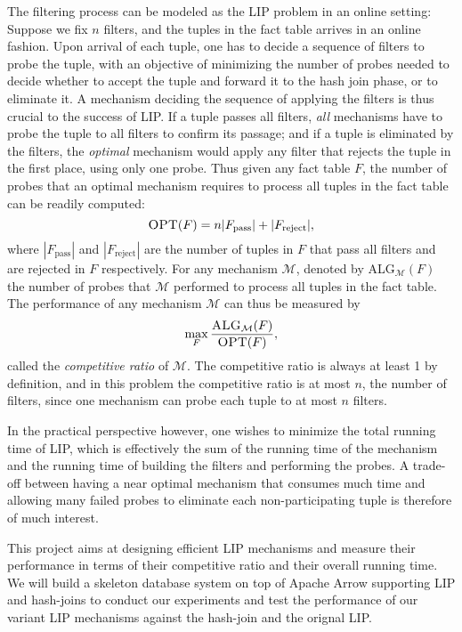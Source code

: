 \documentclass[10pt]{article}
\begin{document}
The filtering process can be modeled as the \textsc{LIP} problem in an online setting: Suppose we fix $n$ filters, and the tuples in the fact table arrives in an online fashion. Upon arrival of each tuple, one has to decide a sequence of filters to probe the tuple, with an objective of minimizing the number of probes needed to decide whether to accept the tuple and forward it to the hash join phase, or to eliminate it. A mechanism deciding the sequence of applying the filters is thus crucial to the success of LIP. If a tuple passes all filters, \textit{all} mechanisms have to probe the tuple to all filters to confirm its passage; and if a tuple is eliminated by the filters, the \textit{optimal} mechanism would apply any filter that rejects the tuple in the first place, using only one probe. Thus given any fact table $F$, the number of probes that an optimal mechanism requires to process all tuples in the fact table can be readily computed: 
\[
	\textsc{OPT}(F) = n|F_{\text{pass}}| + |F_{\text{reject}}|,
\]
where $|F_{\text{pass}}|$ and $|F_{\text{reject}}|$ are the number of tuples in $F$ that pass all filters and are rejected in $F$ respectively. For any mechanism $\mathcal{M}$, denoted by \textsc{ALG}$_{\mathcal{M}}(F)$ the number of probes that $\mathcal{M}$ performed to process all tuples in the fact table.  The performance of any mechanism $\mathcal{M}$ can thus be measured by 
\[
	\max_{F}\frac{\textsc{ALG}_{\mathcal{M}}(F)}{\textsc{OPT}(F)},
\]
called the \textit{competitive ratio} of $\mathcal{M}$. The competitive ratio is always at least 1 by definition, and in this problem the competitive ratio is at most $n$, the number of filters, since one mechanism can probe each tuple to at most $n$ filters.


In the practical perspective however, one wishes to minimize the total running time of LIP, which is effectively the sum of the running time of the mechanism and the running time of building the filters and performing the probes. A trade-off between having a near optimal mechanism that consumes much time and allowing many failed probes to eliminate each non-participating tuple is therefore of much interest. 


This project aims at designing efficient LIP mechanisms and measure their performance in terms of their competitive ratio and their overall running time. We will build a skeleton database system on top of Apache Arrow supporting LIP and hash-joins to conduct our experiments and test the performance of our variant LIP mechanisms against the hash-join and the orignal LIP.
\end{document}
